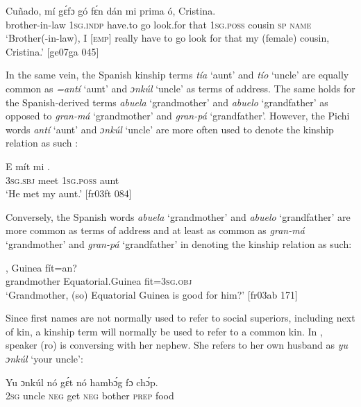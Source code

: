\ea%
    \label{ex:key:1678}
    \gll Cuñado,      mí    gɛ́fɔ    gó  fɛ́n    dán  mi    
prima  ó,  Cristina.\\
brother-in-law  \textsc{1sg.indp}  have.to  go  look.for  that  \textsc{1sg.poss}  
cousin  \textsc{sp}  \textsc{name}\\
\glt ‘Brother(-in-law), I [\textsc{emp}] really have to go look for that my (female) cousin, Cristina.’ [ge07ga 045]
\z

In the same vein, the Spanish kinship terms \textit{tía} ‘aunt’ and \textit{tío} ‘uncle’ are equally common as \textit{=antí} ‘aunt’ and \textit{ɔnkúl} ‘uncle’ as terms of address. The same holds for the Spanish-derived terms \textit{abuela} ‘grandmother’ and \textit{abuelo} ‘grandfather’ as opposed to \textit{gran-má} ‘grandmother’ and \textit{gran-pá} ‘grandfather’. However, the Pichi words \textit{antí} ‘aunt’ and \textit{ɔnkúl} ‘uncle’ are more often used to denote the kinship relation as such : 


\ea%
    \label{ex:key:1679}
    \gll E    mít    mi    .\\
\textsc{3sg.sbj}  meet  \textsc{1sg.poss}  aunt\\

\glt ‘He met my aunt.’ [fr03ft 084]
\z

Conversely, the Spanish words \textit{abuela} ‘grandmother’ and \textit{abuelo} ‘grandfather’ are more common as terms of address and at least as common as \textit{gran-má} ‘grandmother’ and \textit{gran-pá} ‘grandfather’ in denoting the kinship relation as such:


\ea%
    \label{ex:key:1680}
    \gll {},    Guinea      fít=an?\\
grandmother  Equatorial.Guinea  fit=\textsc{3sg.obj}\\

\glt ‘Grandmother, (so) Equatorial Guinea is good for him?’ [fr03ab 171]
\z

Since first names are not normally used to refer to social superiors, including next of kin, a kinship term will normally be used to refer to a common kin. In , speaker (ro) is conversing with her nephew. She refers to her own husband as \textit{yu ɔnkúl} ‘your uncle’: 


\ea%
    \label{ex:key:1681}
    \gll Yu  ɔnkúl  nó  gɛ́t  nó  hambɔ́g  fɔ  chɔ́p.\\
\textsc{2sg}  uncle  \textsc{neg}  get  \textsc{neg}  bother  \textsc{prep}  food\\

